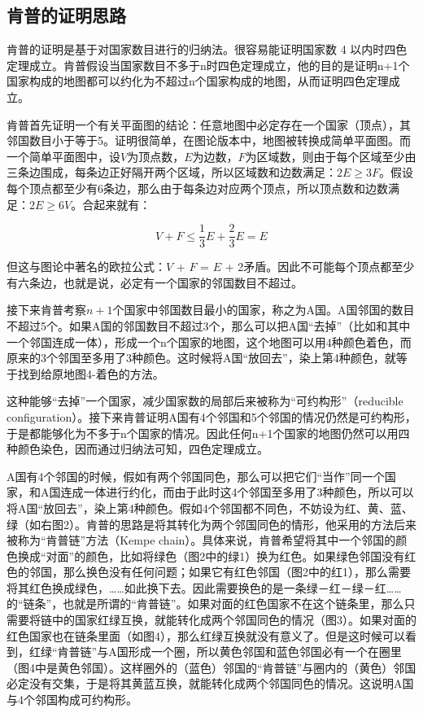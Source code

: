 \documentclass[12pt]{article} %
\begin{document}
\subsection{肯普的证明思路}

肯普的证明是基于对国家数目进行的归纳法。很容易能证明国家数 4 以内时四色定理成立。肯普假设当国家数目不多于n时四色定理成立，他的目的是证明n+1个国家构成的地图都可以约化为不超过n个国家构成的地图，从而证明四色定理成立\cite{NBK}\cite{PRB}。

肯普首先证明一个有关平面图的结论：任意地图中必定存在一个国家（顶点），其邻国数目小于等于5。证明很简单，在图论版本中，地图被转换成简单平面图。而一个简单平面图中，设$V$为顶点数，$E$为边数，$F$为区域数，则由于每个区域至少由三条边围成，每条边正好隔开两个区域，所以区域数和边数满足：$2E$$\geq$$3F$。假设每个顶点都至少有6条边，那么由于每条边对应两个顶点，所以顶点数和边数满足：$2E$$\geq$$6V$。合起来就有：

\begin{equation}
\label{eqn:eqn1}
V+F \leqslant \frac{1}{3} E+\frac{2}{3} E=E
\end{equation}

但这与图论中著名的欧拉公式：$V$ + $F$ = $E$ + 2矛盾。因此不可能每个顶点都至少有六条边，也就是说，必定有一个国家的邻国数目不超过\cite{alex}。

接下来肯普考察$n+1$个国家中邻国数目最小的国家，称之为A国。A国邻国的数目不超过5个。如果A国的邻国数目不超过3个，那么可以把A国“去掉”（比如和其中一个邻国连成一体），形成一个n个国家的地图，这个地图可以用4种颜色着色，而原来的3个邻国至多用了3种颜色。这时候将A国“放回去”，染上第4种颜色，就等于找到给原地图4-着色的方法\cite{PRB}。

这种能够“去掉”一个国家，减少国家数的局部后来被称为“可约构形”（reducible configuration）。接下来肯普证明A国有4个邻国和5个邻国的情况仍然是可约构形，于是都能够化为不多于n个国家的情况。因此任何n+1个国家的地图仍然可以用四种颜色染色，因而通过归纳法可知，四色定理成立\cite{NBK}。

A国有4个邻国的时候，假如有两个邻国同色，那么可以把它们“当作”同一个国家，和A国连成一体进行约化，而由于此时这4个邻国至多用了3种颜色，所以可以将A国“放回去”，染上第4种颜色。假如4个邻国都不同色，不妨设为红、黄、蓝、绿（如右图2）。肯普的思路是将其转化为两个邻国同色的情形，他采用的方法后来被称为“肯普链”方法（Kempe chain）。具体来说，肯普希望将其中一个邻国的颜色换成“对面”的颜色，比如将绿色（图2中的绿1）换为红色。如果绿色邻国没有红色的邻国，那么换色没有任何问题；如果它有红色邻国（图2中的红1），那么需要将其红色换成绿色，……如此换下去。因此需要换色的是一条绿－红－绿－红……的“链条”，也就是所谓的“肯普链”。如果对面的红色国家不在这个链条里，那么只需要将链中的国家红绿互换，就能转化成两个邻国同色的情况（图3）。如果对面的红色国家也在链条里面（如图4），那么红绿互换就没有意义了。但是这时候可以看到，红绿“肯普链”与A国形成一个圈，所以黄色邻国和蓝色邻国必有一个在圈里（图4中是黄色邻国）。这样圈外的（蓝色）邻国的“肯普链”与圈内的（黄色）邻国必定没有交集，于是将其黄蓝互换，就能转化成两个邻国同色的情况。这说明A国与4个邻国构成可约构形\cite{alex}\cite{NBK}。
\end{document}
